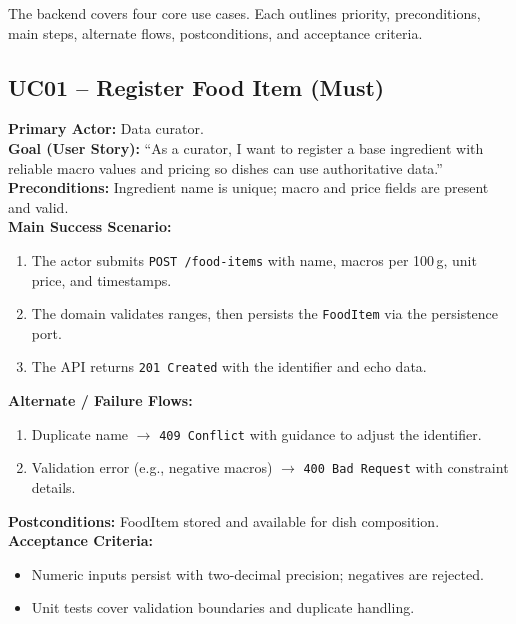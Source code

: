 \documentclass[11pt]{article}
\begin{document}
The backend covers four core use cases. Each outlines priority, preconditions, main steps, alternate flows, postconditions, and acceptance criteria.

\subsection*{UC01 -- Register Food Item (Must)}
\textbf{Primary Actor:} Data curator.\\
\textbf{Goal (User Story):} ``As a curator, I want to register a base ingredient with reliable macro values and pricing so dishes can use authoritative data.''\\
\textbf{Preconditions:} Ingredient name is unique; macro and price fields are present and valid.\\
\textbf{Main Success Scenario:}
\begin{enumerate}[label=\arabic*.]
  \item The actor submits \texttt{POST /food-items} with name, macros per 100\,g, unit price, and timestamps.
  \item The domain validates ranges, then persists the \texttt{FoodItem} via the persistence port.
  \item The API returns \texttt{201 Created} with the identifier and echo data.
\end{enumerate}
\textbf{Alternate / Failure Flows:}
\begin{enumerate}[label=\arabic*F.]
  \item Duplicate name $\rightarrow$ \texttt{409 Conflict} with guidance to adjust the identifier.
  \item Validation error (e.g., negative macros) $\rightarrow$ \texttt{400 Bad Request} with constraint details.
\end{enumerate}
\textbf{Postconditions:} FoodItem stored and available for dish composition.\\
\textbf{Acceptance Criteria:}
\begin{itemize}[noitemsep]
  \item Numeric inputs persist with two-decimal precision; negatives are rejected.
  \item Unit tests cover validation boundaries and duplicate handling.
\end{itemize}
\end{document}
